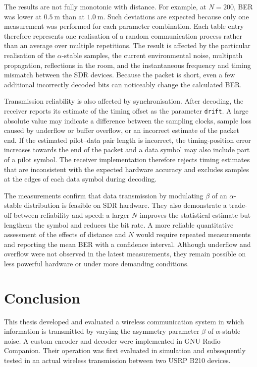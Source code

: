 \documentclass[a4paper, 12pt, openany]{book}
\begin{document}
The results are not fully monotonic with distance. For example, at $N=200$, BER was lower at $0.5~\mathrm{m}$ than at $1.0~\mathrm{m}$. Such deviations are expected because only one measurement was performed for each parameter combination. Each table entry therefore represents one realisation of a random communication process rather than an average over multiple repetitions. The result is affected by the particular realisation of the $\alpha$-stable samples, the current environmental noise, multipath propagation, reflections in the room, and the instantaneous frequency and timing mismatch between the SDR devices. Because the packet is short, even a few additional incorrectly decoded bits can noticeably change the calculated BER.

Transmission reliability is also affected by synchronisation. After decoding, the receiver reports its estimate of the timing offset as the parameter \texttt{drift}. A large absolute value may indicate a difference between the sampling clocks, sample loss caused by underflow or buffer overflow, or an incorrect estimate of the packet end. If the estimated pilot--data pair length is incorrect, the timing-position error increases towards the end of the packet and a data symbol may also include part of a pilot symbol. The receiver implementation therefore rejects timing estimates that are inconsistent with the expected hardware accuracy and excludes samples at the edges of each data symbol during decoding.

The measurements confirm that data transmission by modulating $\beta$ of an $\alpha$-stable distribution is feasible on SDR hardware. They also demonstrate a trade-off between reliability and speed: a larger $N$ improves the statistical estimate but lengthens the symbol and reduces the bit rate. A more reliable quantitative assessment of the effects of distance and $N$ would require repeated measurements and reporting the mean BER with a confidence interval. Although underflow and overflow were not observed in the latest measurements, they remain possible on less powerful hardware or under more demanding conditions.

\chapter{Conclusion}

This thesis developed and evaluated a wireless communication system in which information is transmitted by varying the asymmetry parameter $\beta$ of $\alpha$-stable noise. A custom encoder and decoder were implemented in GNU Radio Companion. Their operation was first evaluated in simulation and subsequently tested in an actual wireless transmission between two USRP B210 devices.
\end{document}
